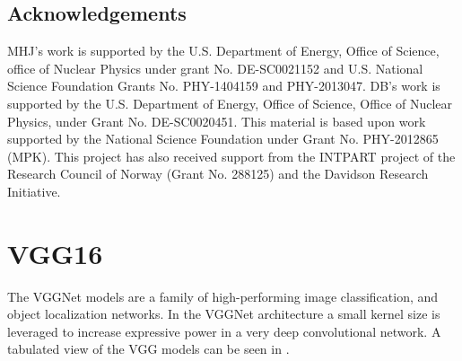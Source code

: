 \documentclass[preprint,12pt]{elsarticle}
\begin{document}




\subsection*{Acknowledgements}
MHJ’s work is supported by the U.S. Department of Energy, Office of Science, office of Nuclear Physics under grant No. DE-SC0021152 and U.S. National Science Foundation Grants No. PHY-1404159 and PHY-2013047. DB's work is supported by the U.S. Department of Energy, Office of Science, Office of Nuclear Physics, under Grant No. DE-SC0020451. This material is based upon work supported by the National Science Foundation under Grant No. PHY-2012865  (MPK). This project has also received support from the INTPART project of the Research Council of Norway (Grant No. 288125) and the Davidson Research Initiative. 

\appendix  

\section{VGG16}\label{app:vgg}

The VGGNet models are a family of high-performing image classification, and object localization networks. In the VGGNet architecture a small kernel size is leveraged to increase expressive power in a very deep convolutional network. A tabulated view of the VGG models can be seen in \cite{Simonyan2014}. 
\end{document}
